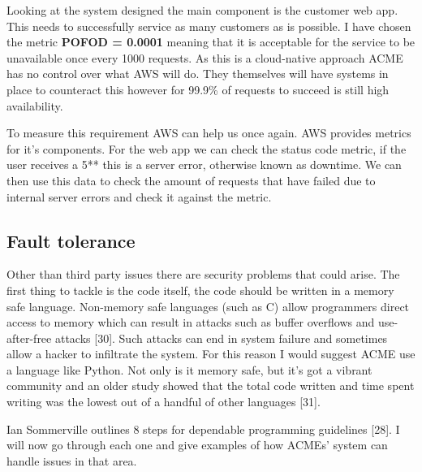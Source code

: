   Looking at the system designed the main component is the customer web app. This needs to successfully service as many customers as is possible.
  I have chosen the metric \textbf{POFOD = 0.0001} meaning that it is acceptable for the service to be unavailable once every 1000 requests. As this is a 
  cloud-native approach ACME has no control over what AWS will do. They themselves will have systems in place to counteract this however for 99.9\% of
  requests to succeed is still high availability.

  To measure this requirement AWS can help us once again. AWS provides metrics for it's components. For the web app we can check the status code
  metric, if the user receives a 5** this is a server error, otherwise known as downtime. We can then use this data to check the amount of requests that 
  have failed due to internal server errors and check it against the metric.

  \subsection{Fault tolerance}
  Other than third party issues there are security problems that could arise. The first thing to tackle is the code itself, the code should be written in 
  a memory safe language. Non-memory safe languages (such as C) allow programmers direct access to memory which can result in attacks such as buffer
  overflows and use-after-free attacks [30]. Such attacks can end in system failure and sometimes allow a hacker to infiltrate the system. For this 
  reason I would suggest ACME use a language like Python. Not only is it memory safe, but it's got a vibrant community and an older study showed
  that the total code written and time spent writing was the lowest out of a handful of other languages [31].

  Ian Sommerville outlines 8 steps for dependable programming guidelines [28]. I will now go through each one and give examples of how ACMEs' system can 
  handle issues in that area.

